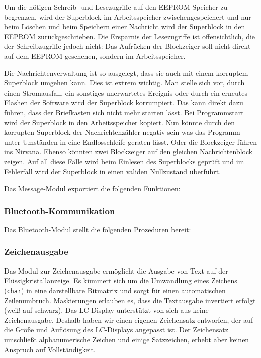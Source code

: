 \documentclass[ngerman]{article}
\begin{document}
Um die nötigen Schreib- und Lesezugriffe auf den EEPROM-Speicher zu begrenzen, wird der Superblock im Arbeitsspeicher
zwischengespeichert und nur beim Löschen und beim Speichern einer Nachricht
wird der Superblock in den EEPROM zurückgeschrieben. Die Ersparnis der
Lesezugriffe ist offensichtlich, die der Schreibzugriffe jedoch nicht:
Das Aufrücken der Blockzeiger soll nicht direkt auf dem EEPROM geschehen,
sondern im Arbeitsspeicher.

Die Nachrichtenverwaltung ist so ausgelegt, dass sie auch mit
einem korruptem Superblock umgehen kann. Dies ist extrem wichtig. Man
stelle sich vor, durch einen Stromausfall, ein sonstiges unerwartetes Ereignis
oder durch ein erneutes Flashen der Software wird der Superblock korrumpiert.
Das kann direkt dazu führen, dass der Briefkasten sich nicht mehr starten
lässt. Bei Programmstart wird der Superblock in den Arbeitsspeicher kopiert.
Nun könnte durch den korrupten Superblock der Nachrichtenzähler negativ sein
was das Programm unter Umständen in eine Endlosschleife geraten lässt. Oder
die Blockzeiger führen ins Nirvana. Ebenso könnten zwei Blockzeiger auf
den gleichen Nachrichtenblock zeigen. Auf all diese Fälle wird beim Einlesen
des Superblocks geprüft und im Fehlerfall wird der Superblock in einen
validen Nullzustand überführt.

Das Message-Modul exportiert die folgenden Funktionen:




\subsubsection{Bluetooth-Kommunikation}

Das Bluetooth-Modul stellt die folgenden Prozeduren bereit:



\subsubsection{Zeichenausgabe}

Das Modul zur Zeichenausgabe ermöglicht die Ausgabe von Text auf
der Flüs\-sig\-kris\-tall\-an\-zei\-ge. Es kümmert sich um die Umwandlung
eines Zeichens ({\tt char}) in eine darstellbare Bitmatrix und sorgt für
einen automatischen Zeilenumbruch. Maskierungen erlauben es, dass die
Textausgabe invertiert erfolgt (weiß auf schwarz). Das LC-Display 
unterstützt von sich aus keine Zeichenausgabe. Deshalb haben wir einen
eigenen Zeichensatz entworfen, der auf die Größe und Auflösung des 
LC-Displays angepasst ist. Der Zeichensatz umschließt alphanumerische
Zeichen und einige Satzzeichen, erhebt aber keinen Anspruch auf
Vollständigkeit.
\end{document}
